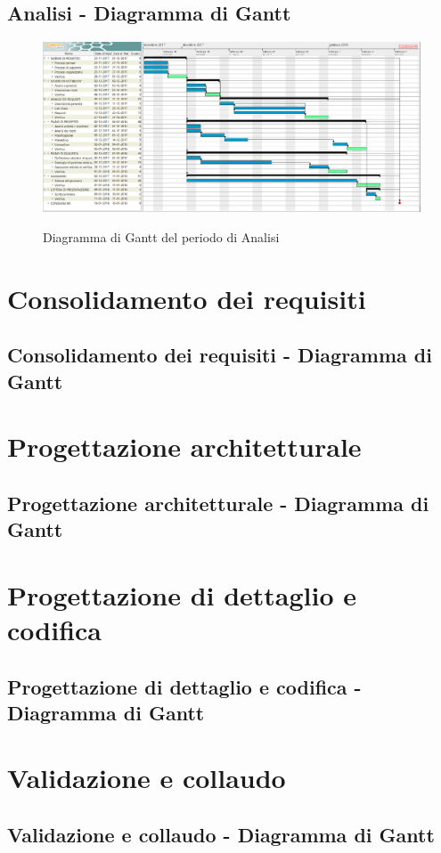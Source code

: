 \documentclass[PianoDiProgetto.tex]{subfiles}
\begin{document}
\begin{landscape}
	\subsection{Analisi - Diagramma di Gantt}
	\begin{figure}[ht]	
		\includegraphics[width=20.5cm]{images/gantt/analisi.png}
		\label{fig:foo}
		\caption{Diagramma di Gantt del periodo di Analisi}		
	\end{figure}			
\end{landscape}	

\section{Consolidamento dei requisiti}
\subsection{Consolidamento dei requisiti - Diagramma di Gantt}

\section{Progettazione architetturale}
\subsection{Progettazione architetturale - Diagramma di Gantt}

\section{Progettazione di dettaglio e codifica}
\subsection{Progettazione di dettaglio e codifica - Diagramma di Gantt}

\section{Validazione e collaudo}
\subsection{Validazione e collaudo - Diagramma di Gantt}
\end{document}
